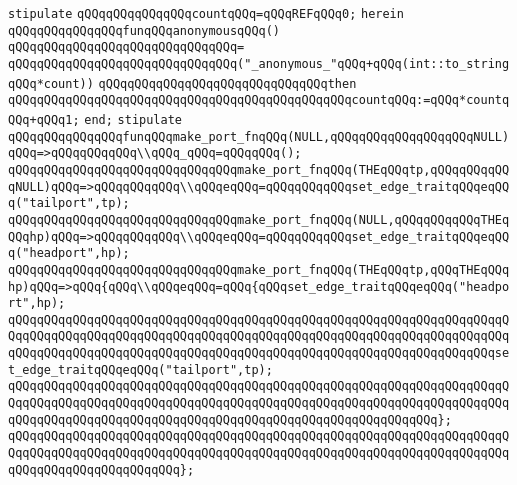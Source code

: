 \newline
\verb|stipulate|\newline
\verb|qQQqqQQqqQQqqQQqcountqQQq=qQQqREFqQQq0;|\newline
\verb|herein|\newline
\verb|qQQqqQQqqQQqqQQqfunqQQqanonymousqQQq()|\newline
\verb|qQQqqQQqqQQqqQQqqQQqqQQqqQQqqQQq=|\newline
\verb|qQQqqQQqqQQqqQQqqQQqqQQqqQQqqQQq("_anonymous_"qQQq+qQQq(int::to_stringqQQq*count))|\newline
\verb|qQQqqQQqqQQqqQQqqQQqqQQqqQQqqQQqthen|\newline
\verb|qQQqqQQqqQQqqQQqqQQqqQQqqQQqqQQqqQQqqQQqqQQqqQQqcountqQQq:=qQQq*countqQQq+qQQq1;|\newline
\verb|end;|\newline
\newline
\verb|stipulate|\newline
\newline
\verb|qQQqqQQqqQQqqQQqfunqQQqmake_port_fnqQQq(NULL,qQQqqQQqqQQqqQQqqQQqNULL)qQQq=>qQQqqQQqqQQq\\qQQq_qQQq=qQQqqQQq();|\newline
\verb|qQQqqQQqqQQqqQQqqQQqqQQqqQQqqQQqmake_port_fnqQQq(THEqQQqtp,qQQqqQQqqQQqNULL)qQQq=>qQQqqQQqqQQq\\qQQqeqQQq=qQQqqQQqqQQqset_edge_traitqQQqeqQQq("tailport",tp);|\newline
\verb|qQQqqQQqqQQqqQQqqQQqqQQqqQQqqQQqmake_port_fnqQQq(NULL,qQQqqQQqqQQqTHEqQQqhp)qQQq=>qQQqqQQqqQQq\\qQQqeqQQq=qQQqqQQqqQQqset_edge_traitqQQqeqQQq("headport",hp);|\newline
\verb|qQQqqQQqqQQqqQQqqQQqqQQqqQQqqQQqmake_port_fnqQQq(THEqQQqtp,qQQqTHEqQQqhp)qQQq=>qQQq{qQQq\\qQQqeqQQq=qQQq{qQQqset_edge_traitqQQqeqQQq("headport",hp);|\newline
\verb|qQQqqQQqqQQqqQQqqQQqqQQqqQQqqQQqqQQqqQQqqQQqqQQqqQQqqQQqqQQqqQQqqQQqqQQqqQQqqQQqqQQqqQQqqQQqqQQqqQQqqQQqqQQqqQQqqQQqqQQqqQQqqQQqqQQqqQQqqQQqqQQqqQQqqQQqqQQqqQQqqQQqqQQqqQQqqQQqqQQqqQQqqQQqqQQqqQQqqQQqqQQqqQQqset_edge_traitqQQqeqQQq("tailport",tp);|\newline
\verb|qQQqqQQqqQQqqQQqqQQqqQQqqQQqqQQqqQQqqQQqqQQqqQQqqQQqqQQqqQQqqQQqqQQqqQQqqQQqqQQqqQQqqQQqqQQqqQQqqQQqqQQqqQQqqQQqqQQqqQQqqQQqqQQqqQQqqQQqqQQqqQQqqQQqqQQqqQQqqQQqqQQqqQQqqQQqqQQqqQQqqQQqqQQqqQQqqQQqqQQq};|\newline
\verb|qQQqqQQqqQQqqQQqqQQqqQQqqQQqqQQqqQQqqQQqqQQqqQQqqQQqqQQqqQQqqQQqqQQqqQQqqQQqqQQqqQQqqQQqqQQqqQQqqQQqqQQqqQQqqQQqqQQqqQQqqQQqqQQqqQQqqQQqqQQqqQQqqQQqqQQqqQQqqQQqqQQq};|\newline
